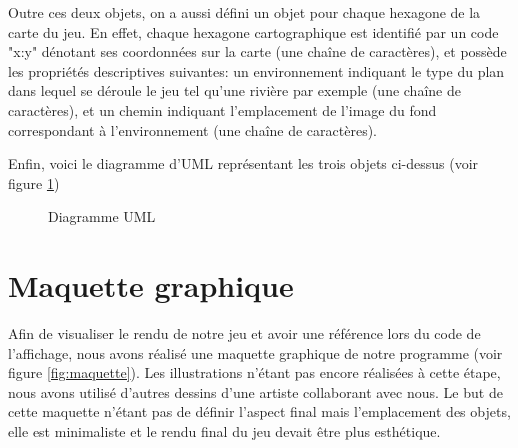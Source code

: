 \documentclass[12pt]{report}
\begin{document}
		Outre ces deux objets, on a aussi défini un objet pour chaque hexagone de la carte du jeu. En effet, chaque hexagone cartographique est identifié par un code "x:y" dénotant ses coordonnées sur la carte (une chaîne de caractères), et possède les propriétés descriptives suivantes: un environnement indiquant le type du plan dans lequel se déroule le jeu tel qu'une rivière par exemple (une chaîne de caractères), et un chemin indiquant l'emplacement de l'image du fond correspondant à l'environnement (une chaîne de caractères).

		Enfin, voici le diagramme d'UML représentant les trois objets ci-dessus (voir figure \ref{fig:UML})

		\begin{figure}
			\caption{Diagramme UML}
			\label{fig:UML}
		\end{figure}

    \section{Maquette graphique}

	    Afin de visualiser le rendu de notre jeu et avoir une référence lors du code de l'affichage, nous avons réalisé une maquette graphique de notre programme (voir figure \ref{fig:maquette}). Les illustrations n'étant pas encore réalisées à cette étape, nous avons utilisé d'autres dessins d'une artiste collaborant avec nous. Le but de cette maquette n'étant pas de définir l'aspect final mais l'emplacement des objets, elle est minimaliste et le rendu final du jeu devait être plus esthétique.\\[1.5cm]
\end{document}
